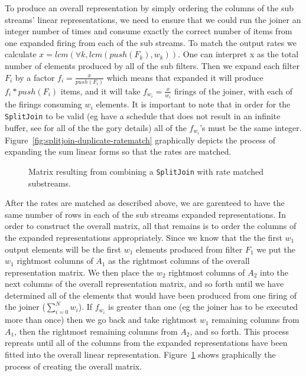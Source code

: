 To produce an overall representation by simply ordering the columns of the sub streams'
linear representations, we need to ensure that we could run the joiner
an integer number of times and consume exactly the correct number of items from one
expanded firing from each of the sub streams. To match the output rates we calculate
$x=lcm(\forall k, lcm(push(F_k),w_k))$. One can interpret x as the total number of elements
produced by all of the sub filters. Then we expand each filter $F_i$ by a factor
$f_i=\frac{x}{push(F_i)}$ which means that expanded it will produce $f_i*push(F_i)$ items, and
it will take $f_{w_i}=\frac{x}{w_i}$ firings of the joiner, with each of the firings consuming
$w_i$ elements. It is important to note that in order for the {\tt SplitJoin} to be valid
(eg have a schedule that does not result in an infinite buffer, see \cite{karczma-thesis} for
all of the the gory details) all of the $f_{w_i}$'s must be the same integer.
Figure~\ref{fig:splitjoin-duplicate-ratematch} graphically depicts the process of expanding
the sum linear forms so that the rates are matched. 

\begin{figure}
\center
\epsfxsize=3.0in
\caption{Matrix resulting from combining a {\tt SplitJoin} with rate matched substreams.}
\label{fig:splitjoin-duplicate-matrix}
\end{figure}

After the rates are matched as described above, we are garenteed to have the same number of rows
in each of the sub streams expanded representations. In order to construct the overall matrix, 
all that remains is to order the columns of the expanded representations appropriately. 
Since we know that the the first $w_1$ output elements will be the first $w_1$ elements 
produced from filter $F_1$ we put the $w_1$ rightmost columns of $A_1$ as the rightmost
columns of the overall representation matrix. We then place the $w_2$ rightmost columns of $A_2$ 
into the next columns of the overall representation matrix, and so forth until
we have determined all of the elements that would have been produced from one firing of 
the joiner ($\sum_{i=0}^{N} w_{i}$). If $f_{w_i}$ is greater than one 
(eg the joiner has to be executed more than once) then we go back and take rightmost
$w_1$ remaining columns from $A_1$, then the rightmost remaining columns from $A_2$, and
so forth. This process repreats until all of the columns from the expanded representations have
been fitted into the overall linear representation. Figure~\ref{fig:splitjoin-duplicate-matrix} 
shows graphically the process of creating the overall matrix.


